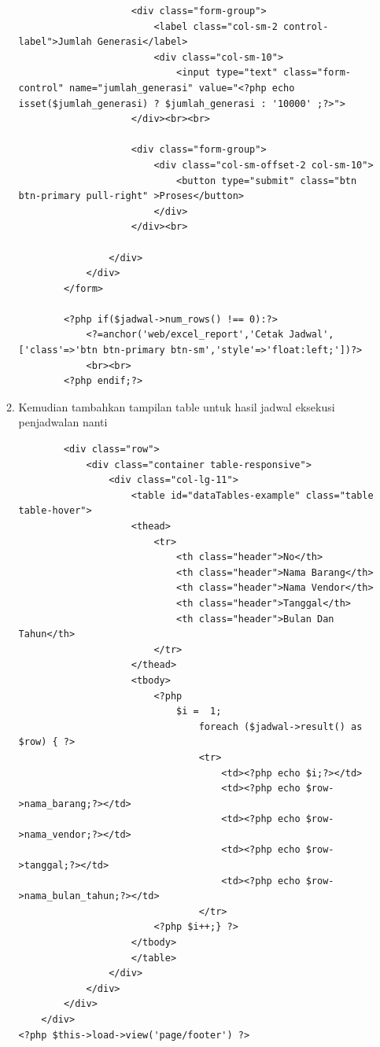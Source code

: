\begin{enumerate}
\begin{enumerate}
\begin{lstlisting}
                    <div class="form-group">
                        <label class="col-sm-2 control-label">Jumlah Generasi</label>
                        <div class="col-sm-10">
                            <input type="text" class="form-control" name="jumlah_generasi" value="<?php echo isset($jumlah_generasi) ? $jumlah_generasi : '10000' ;?>">  
                    </div><br><br>
            
                    <div class="form-group">
                        <div class="col-sm-offset-2 col-sm-10">
                            <button type="submit" class="btn btn-primary pull-right" >Proses</button>
                        </div>
                    </div><br>
                
                </div>  
            </div>
        </form>

        <?php if($jadwal->num_rows() !== 0):?>
            <?=anchor('web/excel_report','Cetak Jadwal',['class'=>'btn btn-primary btn-sm','style'=>'float:left;'])?>
            <br><br>
        <?php endif;?>
\end{lstlisting}
    		
    	\item Kemudian tambahkan tampilan table untuk hasil jadwal eksekusi penjadwalan nanti
\begin{lstlisting}
        <div class="row">
            <div class="container table-responsive">
                <div class="col-lg-11">
                    <table id="dataTables-example" class="table table-hover">
                    <thead>
                        <tr>
                            <th class="header">No</th>
                            <th class="header">Nama Barang</th>
                            <th class="header">Nama Vendor</th>
                            <th class="header">Tanggal</th>
                            <th class="header">Bulan Dan Tahun</th>
                        </tr>
                    </thead>
                    <tbody>
                        <?php 
                            $i =  1;
                                foreach ($jadwal->result() as $row) { ?>
                                <tr>
                                    <td><?php echo $i;?></td>
                                    <td><?php echo $row->nama_barang;?></td>
                                    <td><?php echo $row->nama_vendor;?></td>
                                    <td><?php echo $row->tanggal;?></td>
                                    <td><?php echo $row->nama_bulan_tahun;?></td> 
                                </tr>
                        <?php $i++;} ?>
                    </tbody>
                    </table>
                </div>
            </div>
        </div>
    </div>
<?php $this->load->view('page/footer') ?>
\end{lstlisting}
    	

\end{enumerate}
\end{enumerate}
